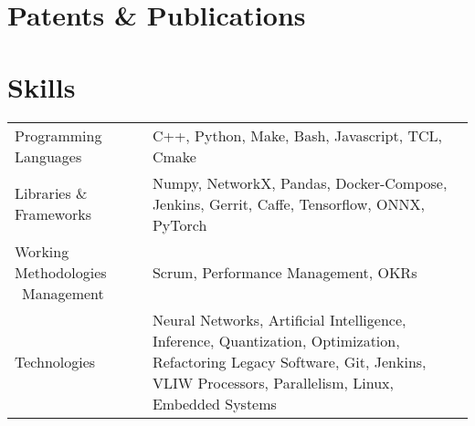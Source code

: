 \documentclass[a4paper,12pt]{article}
\begin{document}
\section{Patents \& Publications}

\begin{refsection}
\nocite{*}
\printbibliography[type=patent, title={Patents}, heading=subbibliography]
\printbibliography[type=article, title={Journal Papers}, heading=subbibliography]
\printbibliography[type=inproceedings ,title={Conference Papers}, heading=subbibliography]
\printbibliography[type=misc, title={Posters and Demos}, heading=subbibliography]
\printbibliography[type=thesis, title={Theses}, heading=subbibliography]
\end{refsection}



\section{Skills}
\begin{tabularx}{\linewidth}{@{}l X@{}}
Programming Languages &  \normalsize{C++, Python, Make, Bash, Javascript, TCL, Cmake}\\
Libraries \& Frameworks &  \normalsize{Numpy, NetworkX, Pandas, Docker-Compose, Jenkins, Gerrit, Caffe, Tensorflow, ONNX, PyTorch}\\
Working Methodologies \ Management &  \normalsize{Scrum, Performance Management, OKRs}\\
Technologies  &  \normalsize{Neural Networks, Artificial Intelligence, Inference, Quantization, Optimization, Refactoring Legacy Software, Git, Jenkins, VLIW Processors, Parallelism, Linux, Embedded Systems}\\  
\end{tabularx}

\vfill
{}
\end{document}
